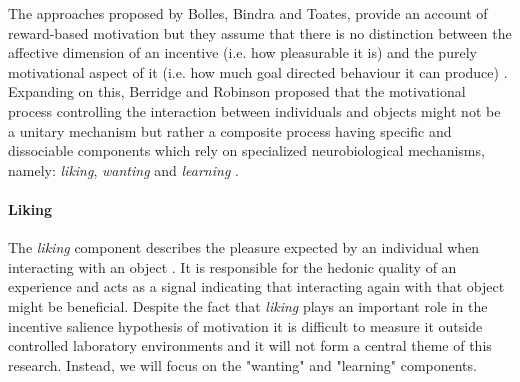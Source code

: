 The approaches proposed by Bolles, Bindra and Toates,  provide an account of reward-based motivation but they assume that there is no distinction between the affective dimension of an incentive (i.e. how pleasurable it is) and the purely motivational aspect of it (i.e. how much goal directed behaviour it can produce) \cite{bindra1978adaptive,toates1994comparing}. Expanding on this, Berridge and Robinson proposed that the motivational process controlling the interaction between individuals and objects might not be a unitary mechanism but rather a composite process having specific and dissociable components which rely on specialized neurobiological mechanisms, namely: \emph{liking}, \emph{wanting} and \emph{learning} \cite{berridge1998role,berridge2009dissecting,smith2011disentangling}.

\paragraph{Liking}
\label{liking}
The \emph{liking} component describes the pleasure expected by an individual when interacting with an object \cite{berridge2009dissecting}. It is responsible for the hedonic quality of an experience and acts as a signal indicating that interacting again with that object might be beneficial. Despite the fact that \emph{liking} plays an important role in the incentive salience hypothesis of motivation it is difficult to measure it outside controlled laboratory environments \cite{berridge1998role} and it will not form a central theme of this research. Instead, we will focus on the "wanting" and "learning" components.


